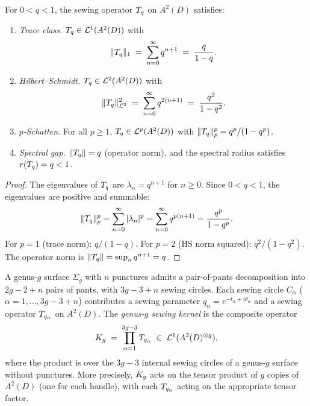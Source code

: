 \begin{lemma}%
\label{lem:thqg-X-sewing-schatten}%
%
For $0 < q < 1$, the sewing operator $T_q$ on $A^2(D)$
satisfies:
\begin{enumerate}[label=\textup{(\roman*)}]
\item \emph{Trace class.}
 $T_q \in \mathcal{L}^1(A^2(D))$ with
 \begin{equation}%
 \|\sewop_q\|_1
 \;=\;
 \sum_{n=0}^{\infty} q^{n+1}
 \;=\;
 \frac{q}{1-q}.
 \end{equation}
\item \emph{Hilbert--Schmidt.}
 $T_q \in \mathcal{L}^2(A^2(D))$ with
 \begin{equation}%
 \|\sewop_q\|_{\hscl}^2
 \;=\;
 \sum_{n=0}^{\infty} q^{2(n+1)}
 \;=\;
 \frac{q^2}{1-q^2}.
 \end{equation}
\item \emph{$p$-Schatten.}
 For all $p \geq 1$,
 $T_q \in \mathcal{L}^p(A^2(D))$ with
 $\|T_q\|_p^p = q^p/(1-q^p)$.
\item \emph{Spectral gap.}
 $\|T_q\| = q$ (operator norm), and the spectral
 radius satisfies $r(T_q) = q < 1$.
\end{enumerate}
\end{lemma}

\begin{proof}
The eigenvalues of $T_q$ are $\lambda_n = q^{n+1}$ for
$n \geq 0$. Since $0 < q < 1$, the eigenvalues are positive
and summable:
\[
\|T_q\|_p^p
= \sum_{n=0}^{\infty} |\lambda_n|^p
= \sum_{n=0}^{\infty} q^{p(n+1)}
= \frac{q^p}{1-q^p}.
\]
For $p = 1$ (trace norm): $q/(1-q)$.
For $p = 2$ (HS norm squared): $q^2/(1-q^2)$.
The operator norm is $\|T_q\| = \sup_n q^{n+1} = q$.
\end{proof}

\begin{definition}%
\label{def:thqg-X-genus-g-sewing}%
%
A genus-$g$ surface $\Sigma_g$ with $n$ punctures admits a
pair-of-pants decomposition into $2g - 2 + n$ pairs of pants,
with $3g - 3 + n$ sewing circles. Each sewing circle
$C_\alpha$ ($\alpha = 1, \ldots, 3g-3+n$) contributes a sewing
parameter $q_\alpha = e^{-t_\alpha + i\theta_\alpha}$ and
a sewing operator $T_{q_\alpha}$ on $A^2(D)$.
The \emph{genus-$g$ sewing kernel} is the composite operator
\begin{equation}%
\sewker_g
\;=\;
\prod_{\alpha=1}^{3g-3}
\sewop_{q_\alpha}
\;\in\;
\trcl(A^2(D)^{\otimes g}),
\end{equation}
where the product is over the $3g-3$ internal sewing circles
of a genus-$g$ surface without punctures.
More precisely, $K_g$ acts on the tensor product of
$g$ copies of $A^2(D)$ (one for each handle),
with each $T_{q_\alpha}$ acting on the appropriate
tensor factor.
\end{definition}

